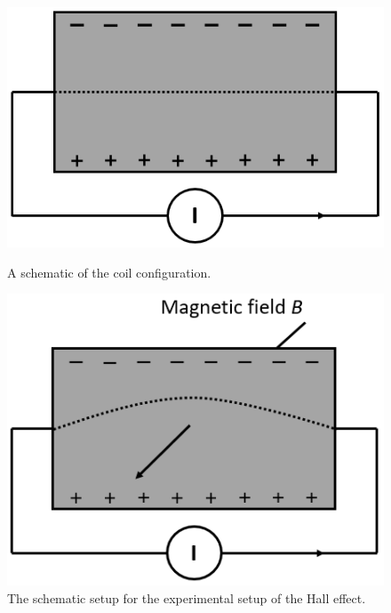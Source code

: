     \begin{figure}[!htbp]
    \begin{center}
        \begin{minipage}[t]{0.45\textwidth}
            \includegraphics[scale=0.45]{figuren/theorie_e_rechtdoor.png}
            \caption{A schematic of the coil configuration.} \label{fig:schematic_setup_magnets}
        \end{minipage}
        \begin{minipage}[t]{0.45\textwidth}
            \includegraphics[scale=0.47]{figuren/theorie_e_afbuigen.png}
             \caption{The schematic setup for the experimental setup of the Hall effect.}\label{fig:schematic_hall_effect}
        \end{minipage}
    \end{center}
    \end{figure}
